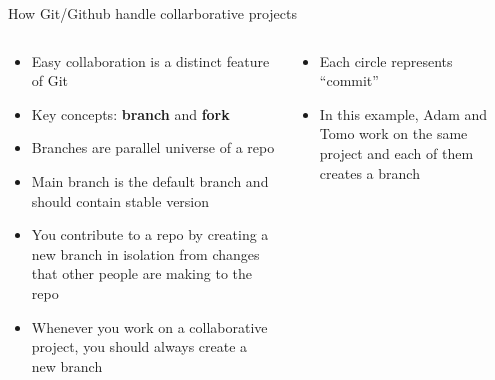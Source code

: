 \documentclass[handout,pdftex,10pt,aspectratio=169]{beamer}
\begin{document}
\begin{frame}{How Git/Github handle collarborative projects}
  \begin{columns}[c]
    \begin{column}{0.55\linewidth}
      \begin{itemize}[<+->]\setlength\itemsep{10pt}
        \item Easy collaboration is a distinct feature of Git
        \item Key concepts: \textbf{branch} and \textbf{fork}
        \item Branches are parallel universe of a repo
        \item Main branch is the default branch and should contain stable version
        \item You contribute to a repo by creating a new branch in isolation from changes 
        that other people are making to the repo
        \item Whenever you work on a collaborative project, you should always create a new branch
      \end{itemize}
    \end{column} \hfill
    \begin{column}{0.44\linewidth}
      \begin{itemize}
        \item<7-> Each circle represents ``commit''
        \item<8-> In this example, Adam and Tomo work on the same project and 
        each of them creates a branch
      \end{itemize}
    \end{column}
  \end{columns}
\end{frame}
\end{document}
